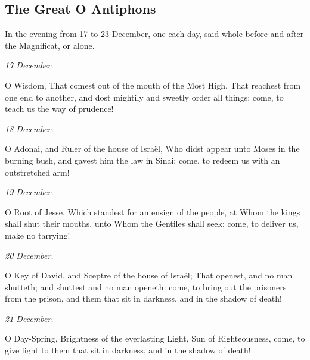\subsection{The Great O Antiphons}

In the evening from 17 to 23 December, one each day, said whole before and
after the Magnificat, or alone.

\noindent\textit{17 December.} \par
\noindent O Wisdom, That comest out of the mouth of the Most High, That reachest from one end to another, and dost mightily and sweetly order all things: come, to teach us the way of prudence!\par
\smallskip

\noindent\textit{18 December.} \par
\noindent O Adonai, and Ruler of the house of Israël, Who didst appear unto Moses in the burning bush, and gavest him the law in Sinai: come, to redeem us with an outstretched arm!\par
\smallskip

\noindent\textit{19 December.} \par
\noindent O Root of Jesse, Which standest for an ensign of the people, at Whom the kings shall shut their mouths, unto Whom the Gentiles shall seek: come, to deliver us, make no tarrying!\par
\smallskip

\noindent\textit{20 December.} \par
\noindent O Key of David, and Sceptre of the house of Israël; That openest, and no man shutteth; and shuttest and no man openeth: come, to bring out the prisoners from the prison, and them that sit in darkness, and in the shadow of death!\par
\smallskip

\noindent\textit{21 December.} \par
\noindent O Day-Spring, Brightness of the everlasting Light, Sun of Righteousness, come, to give light to them that sit in darkness, and in the shadow of death!\par
\smallskip

